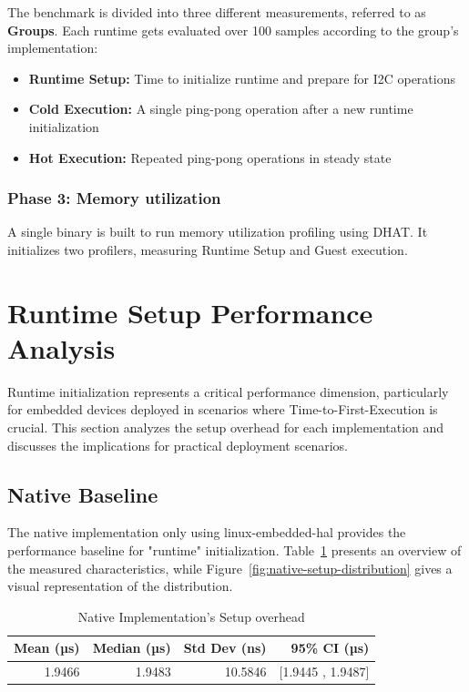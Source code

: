 The benchmark is divided into three different measurements, referred to as \textbf{Groups}. Each runtime gets evaluated over 100 samples according to the group's implementation:
\begin{itemize}
    \item \textbf{Runtime Setup:} Time to initialize runtime and prepare for I2C operations
    \item \textbf{Cold Execution:} A single ping-pong operation after a new runtime initialization
    \item \textbf{Hot Execution:} Repeated ping-pong operations in steady state
\end{itemize}

\subsubsection{Phase 3: Memory utilization}
A single binary is built to run memory utilization profiling using DHAT. It initializes two profilers, measuring Runtime Setup and Guest execution.

\section{Runtime Setup Performance Analysis}
\label{sec:eval-setup}

Runtime initialization represents a critical performance dimension, particularly for embedded devices deployed in scenarios where Time-to-First-Execution is crucial. This section analyzes the setup overhead for each implementation and discusses the implications for practical deployment scenarios.

\subsection{Native Baseline}
\label{subsec:eval-setup-native}

The native implementation only using linux-embedded-hal provides the performance baseline for "runtime" initialization. Table~\ref{tab:native-setup} presents an overview of the measured characteristics, while Figure~\ref{fig:native-setup-distribution} gives a visual representation of the distribution.

\begin{table}[htbp]
    \centering
    \caption{Native Implementation's Setup overhead}
    \label{tab:native-setup}
    \begin{tabular}{rrrr}
        \toprule
        \textbf{Mean (µs)} & \textbf{Median (µs)} & \textbf{Std Dev (ns)} & \textbf{95\% CI (µs)} \\
        \midrule
        1.9466 & 1.9483 & 10.5846 & [1.9445 , 1.9487] \\
        \bottomrule
    \end{tabular}
\end{table}

